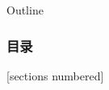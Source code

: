 \maketitle

\begin{frame}{Outline}
	\frametitle{目录}  
	[sections numbered]
	\tableofcontents[hidesubsections]
\end{frame}


